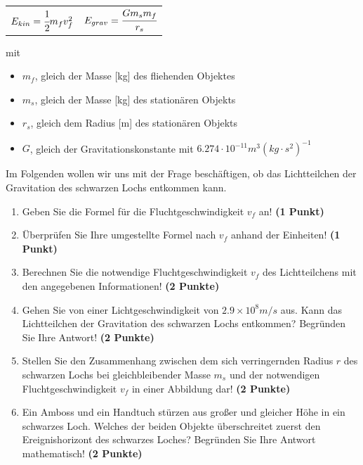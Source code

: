 \documentclass[a4paper, 9pt]{scrartcl}\usepackage[]{graphicx}\usepackage[]{xcolor}
\begin{document}
\begin{center}
  \begin{tabular}{cc}
    $E_{kin} = \cfrac{1}{2}m_fv_f^2$ & $E_{grav} = \cfrac{Gm_sm_f}{r_s}$\\
  \end{tabular}
\end{center}

mit

\begin{itemize}[noitemsep]
\item $m_f$, gleich der Masse [kg] des fliehenden Objektes
\item $m_s$, gleich der Masse [kg] des station{\"a}ren Objekts
\item $r_s$, gleich dem Radius [m] des station{\"a}ren Objekts  
\item $G$, gleich der Gravitationskonstante mit $6.274 \cdot 10^{-11}
  m^3(kg \cdot s^2)^{-1}$ 
\end{itemize}

Im Folgenden wollen wir uns mit der Frage besch{\"a}ftigen, ob das
Lichtteilchen der Gravitation des schwarzen Lochs entkommen kann.

\begin{enumerate}
\item Geben Sie die Formel f{\"u}r die Fluchtgeschwindigkeit $v_f$ an! 
  \textbf{(1 Punkt)}
\item {\"U}berpr{\"u}fen Sie Ihre umgestellte Formel nach $v_f$ anhand der Einheiten!
  \textbf{(1 Punkt)} 
\item Berechnen Sie die notwendige Fluchtgeschwindigkeit $v_f$ des
  Lichtteilchens mit den angegebenen Informationen! \textbf{(2 Punkte)}
\item Gehen Sie von einer Lichtgeschwindigkeit von $\ensuremath{2.9\times 10^{8}}m/s$
  aus. Kann das Lichtteilchen der Gravitation des schwarzen Lochs
  entkommen? Begr{\"u}nden Sie Ihre Antwort! \textbf{(2 Punkte)}
\item Stellen Sie den Zusammenhang zwischen dem sich verringernden Radius
  $r$ des schwarzen Lochs bei gleichbleibender Masse $m_s$
  und der notwendigen Fluchtgeschwindigkeit $v_f$ in einer Abbildung dar!
  \textbf{(2 Punkte)}
 \item Ein Amboss und ein Handtuch st{\"u}rzen aus gro{\ss}er und gleicher H{\"o}he
  in ein schwarzes Loch. Welches der beiden Objekte {\"u}berschreitet zuerst
  den Ereignishorizont des schwarzes Loches? Begr{\"u}nden
  Sie Ihre Antwort mathematisch! \textbf{(2 Punkte)}  
\end{enumerate}
\end{document}
